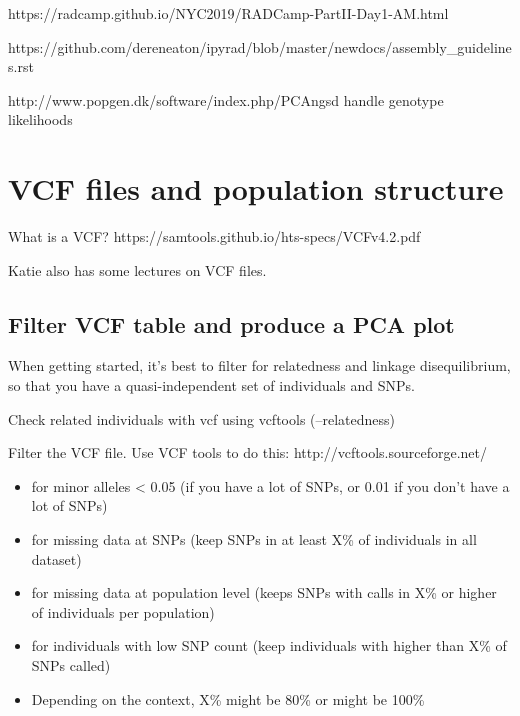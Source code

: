 \documentclass[
  letterpaper,
  DIV=11,
  numbers=noendperiod]{scrreprt}
\begin{document}
https://radcamp.github.io/NYC2019/RADCamp-PartII-Day1-AM.html

https://github.com/dereneaton/ipyrad/blob/master/newdocs/assembly\_guidelines.rst

http://www.popgen.dk/software/index.php/PCAngsd handle genotype
likelihoods

\hypertarget{vcf-files-and-population-structure}{%
\section*{\texorpdfstring{\textbf{VCF files and population
structure}}{VCF files and population structure}}\label{vcf-files-and-population-structure}}

What is a VCF? https://samtools.github.io/hts-specs/VCFv4.2.pdf

Katie also has some lectures on VCF files.

\hypertarget{filter-vcf-table-and-produce-a-pca-plot}{%
\subsection*{\texorpdfstring{\textbf{Filter VCF table and produce a PCA
plot}}{Filter VCF table and produce a PCA plot}}\label{filter-vcf-table-and-produce-a-pca-plot}}

When getting started, it's best to filter for relatedness and linkage
disequilibrium, so that you have a quasi-independent set of individuals
and SNPs.

Check related individuals with vcf using vcftools (--relatedness)

Filter the VCF file. Use VCF tools to do this:
http://vcftools.sourceforge.net/

\begin{itemize}
\item
  for minor alleles \textless{} 0.05 (if you have a lot of SNPs, or 0.01
  if you don't have a lot of SNPs)
\item
  for missing data at SNPs (keep SNPs in at least X\% of individuals in
  all dataset)
\item
  for missing data at population level (keeps SNPs with calls in X\% or
  higher of individuals per population)
\item
  for individuals with low SNP count (keep individuals with higher than
  X\% of SNPs called)
\item
  Depending on the context, X\% might be 80\% or might be 100\%
\end{itemize}
\end{document}
